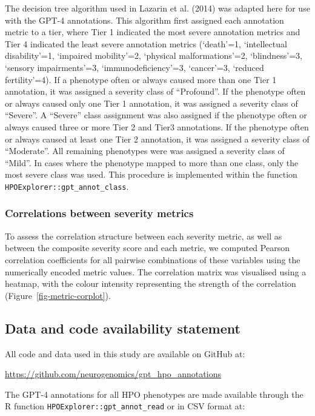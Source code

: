 \documentclass[
]{agujournal2019}
\begin{document}
The decision tree algorithm used in Lazarin et al. (2014) was adapted
here for use with the GPT-4 annotations. This algorithm first assigned
each annotation metric to a tier, where Tier 1 indicated the most severe
annotation metrics and Tier 4 indicated the least severe annotation
metrics (`death'=1, `intellectual disability'=1, `impaired mobility'=2,
`physical malformations'=2, `blindness'=3, `sensory impairments'=3,
`immunodeficiency'=3, `cancer'=3, `reduced fertility'=4). If a phenotype
often or always caused more than one Tier 1 annotation, it was assigned
a severity class of ``Profound''. If the phenotype often or always
caused only one Tier 1 annotation, it was assigned a severity class of
``Severe''. A ``Severe'' class assignment was also assigned if the
phenotype often or always caused three or more Tier 2 and Tier3
annotations. If the phenotype often or always caused at least one Tier 2
annotation, it was assigned a severity class of ``Moderate''. All
remaining phenotypes were was assigned a severity class of ``Mild''. In
cases where the phenotype mapped to more than one class, only the most
severe class was used. This procedure is implemented within the function
\texttt{HPOExplorer::gpt\_annot\_class}.

\subsubsection{Correlations between severity
metrics}\label{correlations-between-severity-metrics-1}

To assess the correlation structure between each severity metric, as
well as between the composite severity score and each metric, we
computed Pearson correlation coefficients for all pairwise combinations
of these variables using the numerically encoded metric values. The
correlation matrix was visualised using a heatmap, with the colour
intensity representing the strength of the correlation
(Figure~\ref{fig-metric-corplot}).

\subsection{Data and code availability
statement}\label{data-and-code-availability-statement}

All code and data used in this study are available on GitHub at:

\url{https://github.com/neurogenomics/gpt_hpo_annotations}

The GPT-4 annotations for all HPO phenotypes are made available through
the R function \texttt{HPOExplorer::gpt\_annot\_read} or in CSV format
at:
\end{document}
